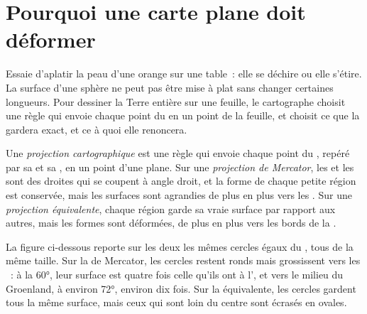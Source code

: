\section{Pourquoi une carte plane doit déformer}

Essaie d'aplatir la peau d'une orange sur une table~: elle se déchire ou
elle s'étire. La surface d'une sphère ne peut pas être mise à plat sans
changer certaines longueurs. Pour dessiner la Terre entière sur une
feuille, le cartographe choisit une règle qui envoie chaque point du 
en un point de la feuille, et choisit ce que la  gardera exact, et ce
à quoi elle renoncera.

\begin{definition}\label{def:g9:maps-of-the-earth:projection}
Une \emph{projection cartographique} est une règle qui envoie
chaque point du , repéré par sa  et sa , en un point
d'une  plane. Sur une \emph{projection de Mercator}, les
 et les  sont des droites qui se coupent à angle droit,
et la forme de chaque petite région est conservée, mais les surfaces sont
agrandies de plus en plus vers les . Sur une \emph{projection équivalente},
chaque région garde sa vraie surface par rapport aux autres, mais les
formes sont déformées, de plus en plus vers les bords de la .
\end{definition}

La figure ci-dessous reporte sur les deux  les mêmes cercles égaux
du , tous de la même taille. Sur la  de Mercator, les cercles
restent ronds mais grossissent vers les ~: à la  \ang{60},
leur surface est quatre fois celle qu'ils ont à l', et vers le
milieu du Groenland, à environ \ang{72}, environ dix fois. Sur la 
équivalente, les cercles gardent tous la même surface, mais ceux qui sont
loin du centre sont écrasés en ovales.

